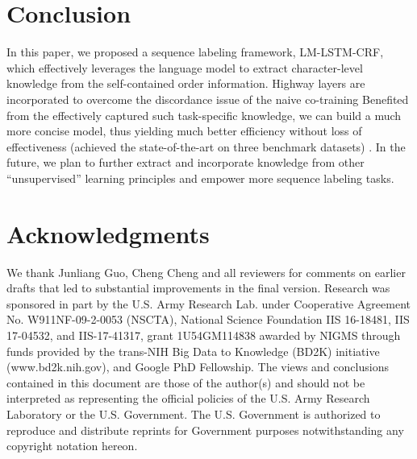 \documentclass[letterpaper]{article} %
\newcommand{\our}{\textsc{LM-LSTM-CRF}\xspace}
\begin{document}
\section{Conclusion}
\label{sect:con}

In this paper, we proposed a sequence labeling framework, \our, which effectively leverages the language model to extract character-level knowledge from the self-contained order information.
Highway layers are incorporated to overcome the discordance issue of the naive co-training
Benefited from the effectively captured such task-specific knowledge, we can build a much more concise model, thus yielding much better efficiency without loss of effectiveness (achieved the state-of-the-art on three benchmark datasets) . 
In the future, we plan to further extract and incorporate knowledge from other ``unsupervised'' learning principles and empower more sequence labeling tasks.


\section*{Acknowledgments}
\label{sect:ack}

We thank Junliang Guo, Cheng Cheng and all reviewers for comments on earlier drafts that led to substantial improvements in the final version.
Research was sponsored in part by the U.S. Army Research Lab. under Cooperative Agreement No. W911NF-09-2-0053 (NSCTA), National Science Foundation IIS 16-18481, IIS 17-04532, and IIS-17-41317, grant 1U54GM114838 awarded by NIGMS through funds provided by the trans-NIH Big Data to Knowledge (BD2K) initiative (www.bd2k.nih.gov), and Google PhD Fellowship. 
The views and conclusions contained in this document are those of the author(s) and should not be interpreted as representing the official policies of the U.S. Army Research Laboratory or the U.S. Government. The U.S. Government is authorized to reproduce and distribute reprints for Government purposes notwithstanding any copyright notation hereon.




\end{document}
